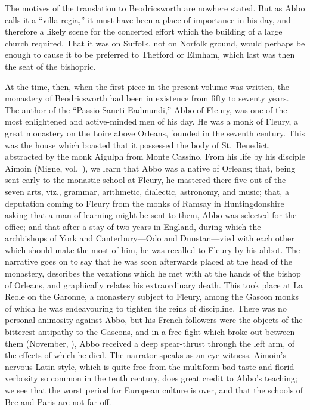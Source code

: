 \documentclass[10pt]{book}
\begin{document}
{The motives of the translation to Beodricsworth are nowhere stated. But as Abbo calls it a ``villa regia,'' it must have been a place of importance in his day, and therefore a likely scene for the concerted effort which the building of a large church required. That it was on Suffolk, not on Norfolk ground, would perhaps be enough to cause it to be preferred to Thetford or Elmham, which last was then the seat of the bishopric.

At the time, then, when the first piece in the present volume was written, the monastery of Beodricsworth had been in existence from fifty to seventy years. The author of the ``Passio Sancti Eadmundi,'' Abbo of Fleury, was one of the most enlightened and active-minded men of his day. He was a monk of Fleury, a great monastery on the Loire above Orleans, founded in the seventh century. This was the house which boasted that it possessed the body of St.\ Benedict, abstracted by the monk Aigulph from Monte Cassino. From his life by his disciple Aimoin (Migne, vol.\ ), we learn that Abbo was a native of Orleans; that, being sent early to the monastic school at Fleury, he mastered there five out of the seven arts, viz., grammar, arithmetic, dialectic, astronomy, and music; that, a deputation coming to Fleury from the monks of Ramsay in Huntingdonshire asking that a man of learning might be sent to them, Abbo was selected for the office; and that after a stay of two years in England, during which the archbishops of York and Canterbury---Odo and Dunstan---vied with each other which should make the most of him, he was recalled to Fleury by his abbot. The narrative goes on to say that he was soon afterwards placed at the head of the monastery, describes the vexations which he met with at the hands of the bishop of Orleans, and graphically relates his extraordinary death. This took place at La Reole on the Garonne, a monastery subject to Fleury, among the Gascon monks of which he was endeavouring to tighten the reins of discipline. There was no personal animosity against Abbo, but his French followers were the objects of the bitterest antipathy to the Gascons, and in a free fight which broke out between them (November, ), Abbo received a deep spear-thrust through the left arm,  of the effects of which he died. The narrator speaks as an eye-witness. Aimoin's nervous Latin style, which is quite free from the multiform bad taste and florid verbosity so common in the tenth century, does great credit to Abbo's teaching; we see that the worst period for European culture is over, and that the schools of Bec and Paris are not far off.

}
\end{document}
